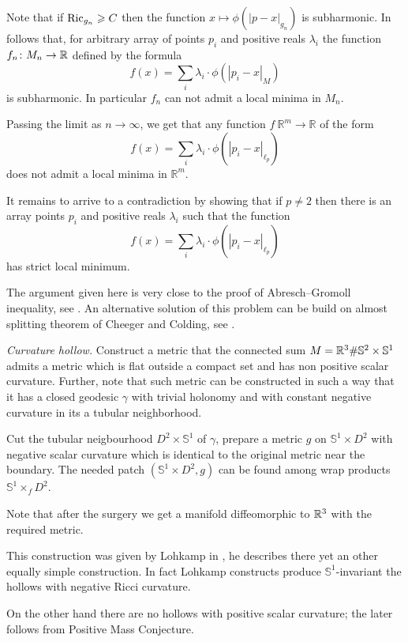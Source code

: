 Note that if $\operatorname{\rm Ric}_{g_n}\geqslant C$ then the function 
$x\mapsto\phi(|p-x|_{g_n})$ is subharmonic.
In follows that, 
for arbitrary array of points $p_i$ 
and positive reals $\lambda_i$ the function $f_n\colon M_n\to \mathbb{R}$
defined by the formula
$$f(x)=\sum_i\lambda_i\cdot\phi(|p_i-x|_M)$$
is subharmonic.
In particular $f_n$ can not admit a local minima in $M_n$.

Passing the limit as $n\to \infty$, we get that any function $f\:\mathbb{R}^m\to\mathbb{R}$
of the form 
$$f(x)=\sum_i\lambda_i\cdot\phi(|p_i-x|_{\ell_p})$$
does not admit a local minima in $\mathbb{R}^m$.

It remains to arrive to a contradiction
by showing that if $p\ne 2$ then there is an array
points $p_i$ and positive reals $\lambda_i$
such that the function 
$$f(x)=\sum_i\lambda_i\cdot\phi(|p_i-x|_{\ell_p})$$
has strict local minimum.

 The argument given here is very close to the proof of Abresch--Gromoll inequality, see \cite{abresch-gromoll}.
An alternative solution of this problem can be build on almost splitting theorem of Cheeger and Colding, see \cite{cheeger-colding}.


\textit{Curvature hollow.}
Construct a metric that the connected sum
$M=\mathbb{R}^3\#\mathbb{S}^2\times\mathbb{S}^1$ admits a metric which is flat outside a compact set and has non positive scalar curvature.
Further, note that such metric can be constructed in such a way that it has a closed geodesic $\gamma$ with trivial holonomy and with constant negative curvature in its a tubular neighborhood.

Cut the tubular neigbourhood $D^2\times \mathbb{S}^1$ of $\gamma$, 
prepare a metric $g$ on $\mathbb{S}^1\times D^2$ with negative scalar curvature which 
is identical to the original metric near the boundary.
The needed patch $(\mathbb{S}^1\times D^2,g)$ can be found among wrap products $\mathbb{S}^1\times_f D^2$.

Note that after the surgery we get a manifold diffeomorphic to $\mathbb{R}^3$ with the required metric.

This construction was given by Lohkamp in \cite{lohkamp},
he describes there yet an other equally simple construction.
In fact Lohkamp  constructs produce $\mathbb{S}^1$-invariant the hollows with negative Ricci curvature.

On the other hand there are no hollows with positive scalar curvature;
the later follows from Positive Mass Conjecture.

